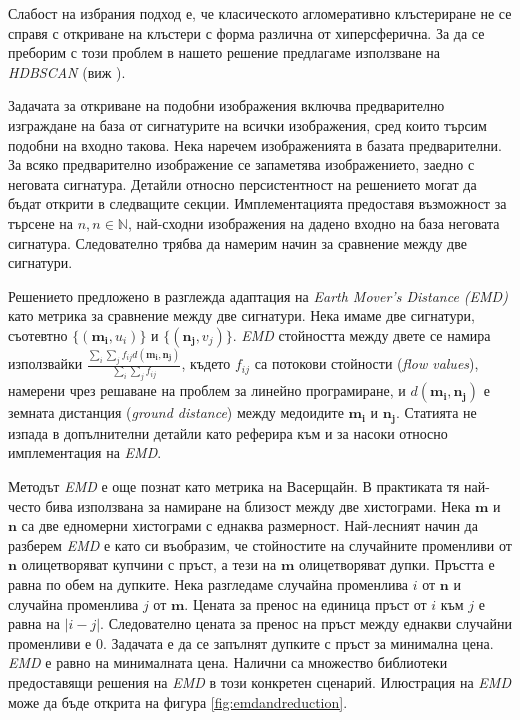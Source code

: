 \documentclass[a4paper,12pt]{article}
\begin{document}
Слабост на избрания подход е, че класическото агломеративно клъстериране не се справя с откриване на клъстери с форма различна от хиперсферична. За да се преборим с този проблем в нашето решение предлагаме използване на \textit{HDBSCAN} (виж \cite{hdbscan}).

\bigbreak

Задачата за откриване на подобни изображения включва предварително изграждане на база от сигнатурите на всички изображения, сред които търсим подобни на входно такова. Нека наречем изображенията в базата предварителни. За всяко предварително изображение се запаметява изображението, заедно с неговата сигнатура. Детайли относно персистентност на решението могат да бъдат открити в следващите секции. Имплементацията предоставя възможност за търсене на $n, n \in \mathbb{N}$, най-сходни изображения на дадено входно на база неговата сигнатура. Следователно трябва да намерим начин за сравнение между две сигнатури.

\bigbreak

Решението предложено в \cite{spinimages} разглежда адаптация на \textit{Earth Mover's Distance (EMD)} като метрика за сравнение между две сигнатури. Нека имаме две сигнатури, съотевтно $\{(\mathbf{m_i}, u_i)\}$ и $\{(\mathbf{n_j}, v_j)\}$. \textit{EMD} стойността между двете се намира използвайки $\frac{\sum_i \sum_j f_{ij} d(\mathbf{m_i}, \mathbf{n_j})}{\sum_i \sum_j f_{ij}}$, където $f_{ij}$ са потокови стойности (\textit{flow values}), намерени чрез решаване на проблем за линейно програмиране, и $d(\mathbf{m_i}, \mathbf{n_j})$ е земната дистанция (\textit{ground distance}) между медоидите $\mathbf{m_i}$ и $\mathbf{n_j}$. Статията не изпада в допълнителни детайли като реферира към \cite{metricfordistributionsforims} и \cite{imretrievalwithoutsegmentation} за насоки относно имплементация на \textit{EMD}.

\bigbreak

Методът \textit{EMD} е още познат като метрика на Васерщайн. В практиката тя най-често бива използвана за намиране на близост между две хистограми. Нека $\mathbf{m}$ и $\mathbf{n}$ са две едномерни хистограми с еднаква размерност. Най-лесният начин да разберем \textit{EMD} е като си въобразим, че стойностите на случайните променливи от $\mathbf{n}$ олицетворяват купчини с пръст, а тези на $\mathbf{m}$ олицетворяват дупки. Пръстта е равна по обем на дупките. Нека разгледаме случайна променлива $i$ от $\mathbf{n}$ и случайна променлива $j$ от $\mathbf{m}$. Цената за пренос на единица пръст от $i$ към $j$ е равна на $|i-j|$. Следователно цената за пренос на пръст между еднакви случайни променливи е $0$. Задачата е да се запълнят дупките с пръст за минимална цена. \textit{EMD} е равно на минималната цена. Налични са множество библиотеки предоставящи решения на \textit{EMD} в този конкретен сценарий. Илюстрация на \textit{EMD} може да бъде открита на фигура \ref{fig:emdandreduction}.
\end{document}
